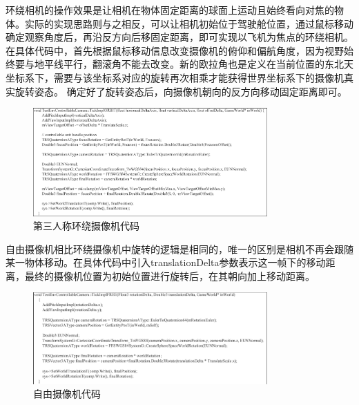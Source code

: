 \par
环绕相机的操作效果是让相机在物体固定距离的球面上运动且始终看向对焦的物体。实际的实现思路则与之相反，可以让相机初始位于驾驶舱位置，通过鼠标移动确定观察角度后，再沿反方向后移固定距离，即可实现以飞机为焦点的环绕相机。
在具体代码中，首先根据鼠标移动信息改变摄像机的俯仰和偏航角度，因为视野始终要与地平线平行，翻滚角不能去改变。新的欧拉角也是定义在当前位置的东北天坐标系下，需要与该坐标系对应的旋转再次相乘才能获得世界坐标系下的摄像机真实旋转姿态。
确定好了旋转姿态后，向摄像机朝向的反方向移动固定距离即可。
\begin{figure}[h!]
    \begin{center}
        \includegraphics[width=0.8\textwidth]{pictures/code25.pdf}
        \caption{第三人称环绕摄像机代码}
    \end{center}
\end{figure}
\par
自由摄像机相比环绕摄像机中旋转的逻辑是相同的，唯一的区别是相机不再会跟随某一物体移动。在具体代码中引入translationDelta参数表示这一帧下的移动距离，最终的摄像机位置为初始位置进行旋转后，在其朝向加上移动距离。
\begin{figure}[h!]
    \begin{center}
        \includegraphics[width=0.8\textwidth]{pictures/code26.pdf}
        \caption{自由摄像机代码}
    \end{center}
\end{figure}
